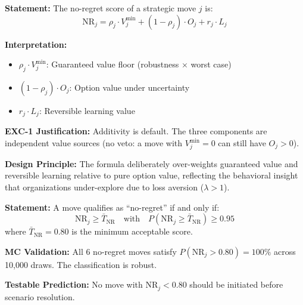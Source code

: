 \begin{tcolorbox}[colback=gray!5!white, colframe=gray!75!black,
    title=Axiom AIM-16: No-Regret Scoring Formula]
\label{ax:aim-16}

\textbf{Statement:}
The no-regret score of a strategic move $j$ is:
\begin{equation}
\text{NR}_j = \rho_j \cdot V_j^{\min} + (1 - \rho_j) \cdot O_j + r_j \cdot L_j
\label{eq:aim-nr-score}
\end{equation}

\textbf{Interpretation:}
\begin{itemize}[nosep]
\item $\rho_j \cdot V_j^{\min}$: Guaranteed value floor (robustness $\times$ worst case)
\item $(1 - \rho_j) \cdot O_j$: Option value under uncertainty
\item $r_j \cdot L_j$: Reversible learning value
\end{itemize}

\textbf{EXC-1 Justification:} Additivity is default. The three components
are independent value sources (no veto: a move with $V_j^{\min} = 0$ can
still have $O_j > 0$).

\textbf{Design Principle:} The formula deliberately over-weights guaranteed
value and reversible learning relative to pure option value, reflecting
the behavioral insight that organizations under-explore due to
loss aversion ($\lambda > 1$).
\end{tcolorbox}


\begin{tcolorbox}[colback=gray!5!white, colframe=gray!75!black,
    title=Axiom AIM-17: No-Regret Threshold]
\label{ax:aim-17}

\textbf{Statement:}
A move qualifies as ``no-regret'' if and only if:
\begin{equation}
\text{NR}_j \geq \bar{T}_{\text{NR}} \quad \text{with} \quad P(\text{NR}_j \geq \bar{T}_{\text{NR}}) \geq 0.95
\label{eq:aim-nr-threshold}
\end{equation}
where $\bar{T}_{\text{NR}} = 0.80$ is the minimum acceptable score.

\textbf{MC Validation:} All 6 no-regret moves satisfy $P(\text{NR}_j > 0.80) = 100\%$
across 10,000 draws. The classification is robust.

\textbf{Testable Prediction:} No move with $\text{NR}_j < 0.80$ should be
initiated before scenario resolution.
\end{tcolorbox}


